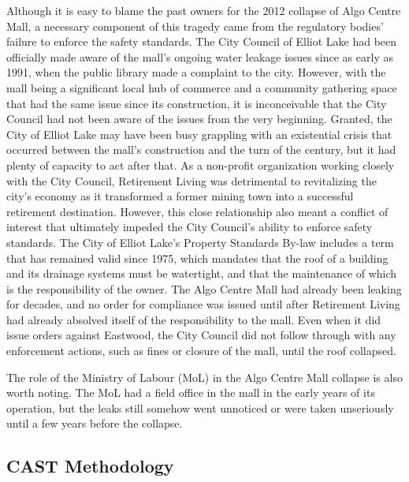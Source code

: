 \documentclass[12pt]{article}
\begin{document}

Although it is easy to blame the past owners for the 2012 collapse of Algo Centre Mall, a necessary component of this tragedy came from the regulatory bodies' failure to enforce the safety standards. The City Council of Elliot Lake had been officially made aware of the mall's ongoing water leakage issues since as early as 1991, when the public library made a complaint to the city. However, with the mall being a significant local hub of commerce and a community gathering space that had the same issue since its construction, it is inconceivable that the City Council had not been aware of the issues from the very beginning. Granted, the City of Elliot Lake may have been busy grappling with an existential crisis that occurred between the mall's construction and the turn of the century, but it had plenty of capacity to act after that. As a non-profit organization working closely with the City Council, Retirement Living was detrimental to revitalizing the city's economy as it transformed a former mining town into a successful retirement destination. However, this close relationship also meant a conflict of interest that ultimately impeded the City Council's ability to enforce safety standards. The City of Elliot Lake's Property Standards By-law includes a term that has remained valid since 1975, which mandates that the roof of a building and its drainage systems must be watertight, and that the maintenance of which is the responsibility of the owner. The Algo Centre Mall had already been leaking for decades, and no order for compliance was issued until after Retirement Living had already absolved itself of the responsibility to the mall. Even when it did issue orders against Eastwood, the City Council did not follow through with any enforcement actions, such as fines or closure of the mall, until the roof collapsed. %

The role of the Ministry of Labour (MoL) in the Algo Centre Mall collapse is also worth noting. The MoL had a field office in the mall in the early years of its operation, but the leaks still somehow went unnoticed or were taken unseriously until a few years before the collapse. %

\subsection{CAST Methodology}
\end{document}
